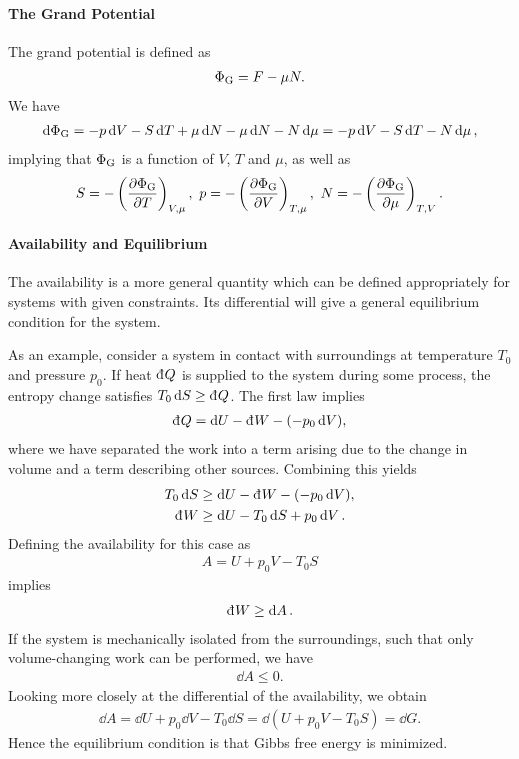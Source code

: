 \paragraph{The Grand Potential}
The grand potential is defined as
\begin{align*}
	\GP = F - \mu N.
\end{align*}
We have
\begin{align*}
	\dd{\GP} = -p\dd{V} - S\dd{T} + \mu\dd{N} - \mu\dd{N} - N\dd{\mu} = -p\dd{V} - S\dd{T} - N\dd{\mu},
\end{align*}
implying that $\GP$ is a function of $V$, $T$ and $\mu$, as well as
\begin{align*}
	S = - \fix{\pdv{\GP}{T}}{V, \mu},\ p = - \fix{\pdv{\GP}{V}}{T, \mu},\ N = - \fix{\pdv{\GP}{\mu}}{T, V}.
\end{align*}

\paragraph{Availability and Equilibrium}
The availability is a more general quantity which can be defined appropriately for systems with given constraints. Its differential will give a general equilibrium condition for the system.

As an example, consider a system in contact with surroundings at temperature $T_{0}$ and pressure $p_{0}$. If heat $\din{Q}$ is supplied to the system during some process, the entropy change satisfies $T_{0}\dd{S} \geq \din{Q}$. The first law implies
\begin{align*}
	\din{Q} = \dd{U} - \din{W} - (-p_{0}\dd{V}),
\end{align*}
where we have separated the work into a term arising due to the change in volume and a term describing other sources. Combining this yields
\begin{align*}
	T_{0}\dd{S} &\geq \dd{U} - \din{W} - (-p_{0}\dd{V}), \\
	\din{W}     &\geq \dd{U} - T_{0}\dd{S}  + p_{0}\dd{V}.
\end{align*}
Defining the availability for this case as
\begin{align*}
	A = U + p_{0}V - T_{0}S
\end{align*}
implies
\begin{align*}
	\din{W} \geq \dd{A}.
\end{align*}
If the system is mechanically isolated from the surroundings, such that only volume-changing work can be performed, we have
\begin{align*}
	\dd{A} \leq 0.
\end{align*}
Looking more closely at the differential of the availability, we obtain
\begin{align*}
	\dd{A} = \dd{U} + p_{0}\dd{V} - T_{0}\dd{S} = \dd(U + p_{0}V - T_{0}S) = \dd{G}.
\end{align*}
Hence the equilibrium condition is that Gibbs free energy is minimized.

